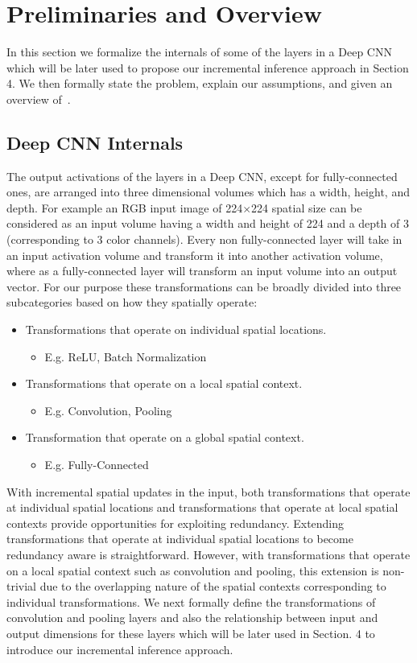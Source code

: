 \section{Preliminaries and Overview}
In this section we formalize the internals of some of the layers in a Deep CNN which will be later used to propose our incremental inference approach in Section 4. We then formally state the problem, explain our assumptions, and given an overview of~\system.

\subsection{Deep CNN Internals}
The output activations of the layers in a Deep CNN, except for fully-connected ones, are arranged into three dimensional volumes which has a width, height, and depth.
For example an RGB input image of 224$\times$224 spatial size can be considered as an input volume having a width and height of 224 and a depth of 3 (corresponding to 3 color channels). Every non fully-connected layer will take in an input activation volume and transform it into another activation volume, where as a fully-connected layer will transform an input volume into an output vector. For our purpose these transformations can be broadly divided into three subcategories based on how they spatially operate:

\begin{itemize}
	\item Transformations that operate on individual spatial locations.
	\begin{itemize}
	 \item E.g. ReLU, Batch Normalization
	\end{itemize}
	\item Transformations that operate on a local spatial context.
	\begin{itemize}
	 \item E.g. Convolution, Pooling
	\end{itemize}
	\item Transformation that operate on a global spatial context.
	\begin{itemize}
	 \item E.g. Fully-Connected
	\end{itemize}
\end{itemize}

With incremental spatial updates in the input, both transformations that operate at individual spatial locations and transformations that operate at local spatial contexts provide opportunities for exploiting redundancy. Extending transformations that operate at individual spatial locations to become redundancy aware is straightforward. However, with transformations that operate on a local spatial context such as convolution and pooling, this extension is non-trivial due to the overlapping nature of the spatial contexts corresponding to individual transformations. We next formally define the transformations of convolution and pooling layers and also the relationship between input and output dimensions for these layers which will be later used in Section. 4 to introduce our incremental inference approach.

